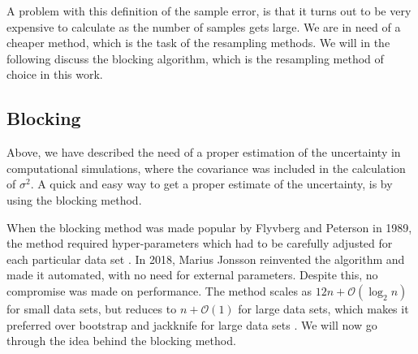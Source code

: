 A problem with this definition of the sample error, is that it turns out to be very expensive to calculate as the number of samples gets large. We are in need of a cheaper method, which is the task of the resampling methods. We will in the following discuss the blocking algorithm, which is the resampling method of choice in this work. 

\subsection{Blocking}\label{sec:resampling}
Above, we have described the need of a proper estimation of the uncertainty in computational simulations, where the covariance was included in
the calculation of $\sigma^2$. A quick and easy way to get a proper estimate of the uncertainty, is by using the blocking method.

When the blocking method was made popular by Flyvberg and Peterson in 1989, the method required hyper-parameters which had to be carefully adjusted for each particular data set \cite{flyvbjerg_error_1989}. In 2018, Marius Jonsson reinvented the algorithm and made it automated, with no need for external parameters. Despite this, no compromise was made on performance. The method scales as $12n+\mathcal{O}(\log_2n)$ for small data sets, but reduces to $n+\mathcal{O}(1)$ for large data sets, which makes it preferred over bootstrap and jackknife for large data sets \cite{jonsson_standard_2018}. We will now go through the idea behind the blocking method.

